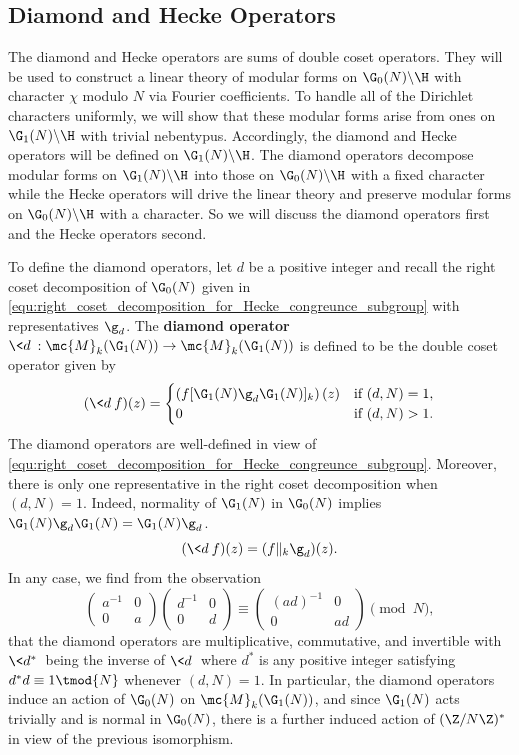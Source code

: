 \documentclass[12pt]{article}
\begin{document}
    \subsection{Diamond and Hecke Operators}
      The diamond and Hecke operators are sums of double coset operators. They will be used to construct a linear theory of modular forms on \(\G_{0}(N)\backslash\H\) with character \(\chi\) modulo \(N\) via Fourier coefficients. To handle all of the Dirichlet characters uniformly, we will show that these modular forms arise from ones on \(\G_{1}(N)\backslash\H\) with trivial nebentypus. Accordingly, the diamond and Hecke operators will be defined on \(\G_{1}(N)\backslash\H\). The diamond operators decompose modular forms on \(\G_{1}(N)\backslash\H\) into those on \(\G_{0}(N)\backslash\H\) with a fixed character while the Hecke operators will drive the linear theory and preserve modular forms on \(\G_{0}(N)\backslash\H\) with a character. So we will discuss the diamond operators first and the Hecke operators second. 
      
      To define the diamond operators, let \(d\) be a positive integer and recall the right coset decomposition of \(\G_{0}(N)\) given in \cref{equ:right_coset_decomposition_for_Hecke_congreunce_subgroup} with representatives \(\g_{d}\). The \textbf{diamond operator} \(\<d\>:\mc{M}_{k}(\G_{1}(N)) \to \mc{M}_{k}(\G_{1}(N))\) is defined to be the double coset operator given by
      \[
        (\<d\>f)(z) = \begin{cases} \left(f[\G_{1}(N)\g_{d}\G_{1}(N)]_{k}\right)(z) & \text{if \((d,N) = 1\)}, \\ 0 & \text{if \((d,N) > 1\)}. \end{cases}
      \]
      The diamond operators are well-defined in view of \cref{equ:right_coset_decomposition_for_Hecke_congreunce_subgroup}. Moreover, there is only one representative in the right coset decomposition when \((d,N) = 1\). Indeed, normality of \(\G_{1}(N)\) in \(\G_{0}(N)\) implies \(\G_{1}(N)\g_{d}\G_{1}(N) = \G_{1}(N)\g_{d}\).
      \[
        (\<d\>f)(z) = (f\|_{k}\g_{d})(z).
      \]
      In any case, we find from the observation
      \[
        \begin{pmatrix} a^{-1} & 0 \\ 0 & a \end{pmatrix}\begin{pmatrix} d^{-1} & 0 \\ 0 & d \end{pmatrix} \equiv \begin{pmatrix} (ad)^{-1} & 0 \\ 0 & ad \end{pmatrix} \pmod{N},
      \]
      that the diamond operators are multiplicative, commutative, and invertible with \(\<d^{\ast}\>\) being the inverse of \(\<d\>\) where \(d^{\ast}\) is any positive integer satisfying \(d^{\ast}d \equiv 1 \tmod{N}\) whenever \((d,N) = 1\). In particular, the diamond operators induce an action of \(\G_{0}(N)\) on \(\mc{M}_{k}(\G_{1}(N))\), and since \(\G_{1}(N)\) acts trivially and is normal in \(\G_{0}(N)\), there is a further induced action of \((\Z/N\Z)^{\ast}\) in view of the previous isomorphism.
      
\end{document}
